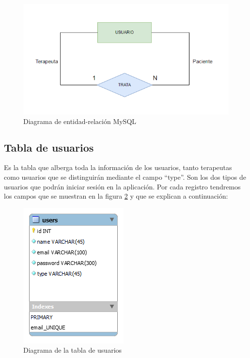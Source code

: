 \begin{figure}[h]
	\centering
	\includegraphics[scale=1.0]{Imagenes/Vectorial/diagrama_entidad_relacion_mysql}
	\caption{Diagrama de entidad-relación MySQL}
	\label{fig:diagramaEER}
\end{figure}

\subsection{Tabla de usuarios}
Es la tabla que alberga toda la información de los usuarios, tanto terapeutas como usuarios que se distinguirán mediante el campo ``type''.
Son los dos tipos de usuarios que podrán iniciar sesión en la aplicación. Por cada registro tendremos los campos que se muestran en la figura \ref{fig:diagramatablausers} y que se explican a continuación:

\begin{figure}[h]
	\centering
	\includegraphics[scale=1.0]{Imagenes/Vectorial/diagrama_tabla_users}
	\caption{Diagrama de la tabla de usuarios}
	\label{fig:diagramatablausers}
\end{figure}

